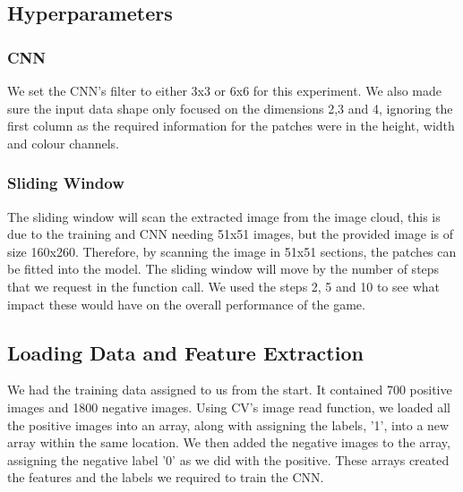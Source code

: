 \documentclass[a4paper,10pt]{article}
\begin{document}
\subsection{Hyperparameters}

\subsubsection{CNN}
We set the CNN's filter to either 3x3 or 6x6 for this experiment. We also made sure the input data shape only focused on the dimensions 2,3 and 4, ignoring the first column as the required information for the patches were in the height, width and colour channels.

\subsubsection{Sliding Window}
The sliding window will scan the extracted image from the image cloud, this is due to the training and CNN needing 51x51 images, but the provided image is of size 160x260. Therefore, by scanning the image in 51x51 sections, the patches can be fitted into the model. The sliding window will move by the number of steps that we request in the function call. We used the steps 2, 5 and 10 to see what impact these would have on the overall performance of the game. 

\subsection{Loading Data and Feature Extraction}
We had the training data assigned to us from the start. It contained 700 positive images and 1800 negative images. Using CV's image read function, we loaded all the positive images into an array, along with assigning the labels, '1', into a new array within the same location. We then added the negative images to the array, assigning the negative label '0' as we did with the positive. These arrays created the features and the labels we required to train the CNN.
\end{document}
